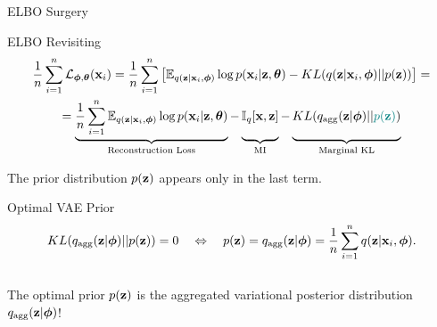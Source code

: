 \documentclass{beamer}
\begin{document}
\begin{frame}{ELBO Surgery}
	\begin{block}{ELBO Revisiting}
		\vspace{-0.7cm}
		{\small
		\begin{multline*}
		    \frac{1}{n}\sum_{i=1}^n \cL_{\bphi, \btheta}(\bx_i) = \frac{1}{n} \sum_{i=1}^n \left[ \mathbb{E}_{q(\bz | \bx_i, \bphi)} \log p(\bx_i | \bz, \btheta) - KL(q(\bz | \bx_i, \bphi) || p(\bz)) \right] = \\
		    = \underbrace{\frac{1}{n} \sum_{i=1}^n \mathbb{E}_{q(\bz | \bx_i, \bphi)} \log p(\bx_i | \bz, \btheta)}_{\text{Reconstruction Loss}} - \underbrace{\vphantom{ \sum_{i=1}^n} \bbI_q [\bx, \bz]}_{\text{MI}} - \underbrace{\vphantom{ \sum_{i=1}^n} KL(q_{\text{agg}}(\bz | \bphi) || {\color{teal}p(\bz)})}_{\text{Marginal KL}}
		\end{multline*}
		}
		\vspace{-0.3cm}
	\end{block}
	The prior distribution $p(\mathbf{z})$ appears only in the last term.
	\begin{block}{Optimal VAE Prior}
		\vspace{-0.7cm}
		\[
	  		KL(q_{\text{agg}}(\mathbf{z} | \boldsymbol{\phi}) || p(\mathbf{z})) = 0 \quad \Leftrightarrow \quad p (\mathbf{z}) = q_{\text{agg}}(\mathbf{z} | \boldsymbol{\phi}) = \frac{1}{n} \sum_{i=1}^n q(\mathbf{z} | \mathbf{x}_i, \boldsymbol{\phi}).
		\]
		\vspace{-0.4cm} \\
		The optimal prior $p(\mathbf{z})$ is the aggregated variational posterior distribution $q_{\text{agg}}(\mathbf{z} | \boldsymbol{\phi})$!
	\end{block}
	
\end{frame}
\end{document}
